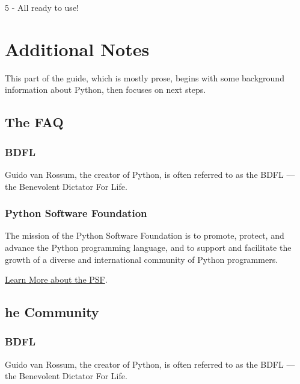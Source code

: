 \documentclass[letterpaper,10pt,english]{sphinxmanual}
\begin{document}
\noindent{}

5 - All ready to use!

\noindent{}


\chapter{Additional Notes}
\label{\detokenize{index:additional-notes}}
This part of the guide, which is mostly prose, begins with some
background information about Python, then focuses on next steps.


\section{The FAQ}
\label{\detokenize{support/faq:the-faq}}\label{\detokenize{support/faq::doc}}

\subsection{BDFL}
\label{\detokenize{support/faq:bdfl}}
Guido van Rossum, the creator of Python, is often referred to as the BDFL — the
Benevolent Dictator For Life.


\subsection{Python Software Foundation}
\label{\detokenize{support/faq:python-software-foundation}}
The mission of the Python Software Foundation is to promote, protect, and
advance the Python programming language, and to support and facilitate the
growth of a diverse and international community of Python programmers.

\href{http://www.python.org/psf/}{Learn More about the PSF}.


\section{he Community}
\label{\detokenize{support/error::doc}}\label{\detokenize{support/error:he-community}}

\subsection{BDFL}
\label{\detokenize{support/error:bdfl}}
Guido van Rossum, the creator of Python, is often referred to as the BDFL — the
Benevolent Dictator For Life.
\end{document}
